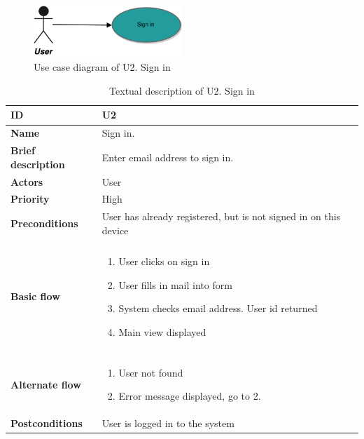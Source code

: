 \begin{figure}[hp]
	\includegraphics[width=0.5\textwidth]{fig/U2}
	\centering
	\caption{Use case diagram of U2. Sign in}
	\label{Fig:U2}
\end{figure}

\begin{table}[hp]
	\renewcommand{\arraystretch}{1.5}
	\centering
	\caption{Textual description of U2. Sign in}
	\begin{tabular}[b]{|l | l|}\hline
		\textbf{ID} 				& U2									\\\hline
		\textbf{Name} 				& Sign in.								\\\hline
		\textbf{Brief description}	& Enter email address to sign in. 		\\\hline
		\textbf{Actors} 			& User									\\\hline
		\textbf{Priority}			& High									\\\hline
		\textbf{Preconditions}		& User has already registered, but is not signed in on this device			\\\hline&\\[-2ex]
		\textbf{Basic flow}			& \begin{minipage}{5in}
			\begin{enumerate}[noitemsep]
				\item User clicks on sign in
				\item User fills in mail into form
				\item System checks email address. User id returned
				\item Main view displayed
			\end{enumerate}						
		\end{minipage}						\\\hline&\\[-2ex]
		\textbf{Alternate flow}		& \begin{minipage}{5in}
			\begin{enumerate}[noitemsep]
				\item User not found
				\item Error message displayed, go to 2.
			\end{enumerate}
		\end{minipage}							\\\hline
		\textbf{Postconditions}		& User is logged in to the system\\\hline
	\end{tabular}
	\label{Tab:U2}
\end{table}

